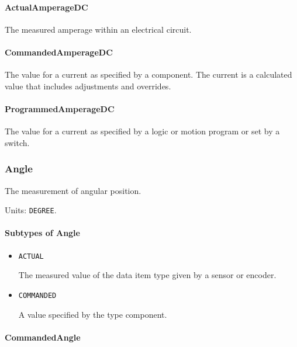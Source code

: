 \paragraph{ActualAmperageDC}\mbox{}
\label{sec:ActualAmperageDC}


The measured amperage within an electrical circuit.


\paragraph{CommandedAmperageDC}\mbox{}
\label{sec:CommandedAmperageDC}


The value for a current as specified by a component. 
The  current is a calculated value that includes adjustments and overrides.


\paragraph{ProgrammedAmperageDC}\mbox{}
\label{sec:ProgrammedAmperageDC}


The value for a current as specified by a logic or motion program or set by a switch.


\subsubsection{Angle}
\label{sec:Angle}



The measurement of angular position.


Units: \texttt{DEGREE}.

\paragraph{Subtypes of Angle}\mbox{}
\label{sec:Subtypes of Angle}

\begin{itemize}

\item \texttt{ACTUAL}


The measured value of the data item type given by a sensor or encoder.

\item \texttt{COMMANDED}


A value specified by the  type component.


\end{itemize}

\paragraph{CommandedAngle}\mbox{}
\label{sec:CommandedAngle}


